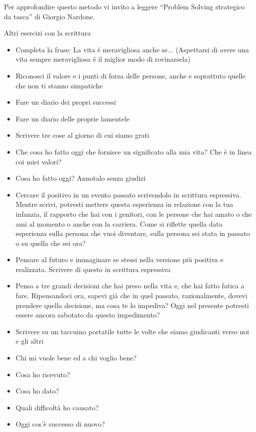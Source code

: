 \documentclass[12pt]{book} %
\begin{document}
Per approfondire questo metodo vi invito a leggere “Problem Solving strategico da
tasca” di Giorgio
Nardone.

Altri esercizi con la scrittura

\begin{itemize}
\item Completa la frase: La vita é meravigliosa anche se... (Aspettarsi di avere una vita sempre meravigliosa é il miglior modo di rovinarsela)
\item Riconosci il valore e i punti di forza delle persone, anche e soprattuto quelle che non ti stanno simpatiche
\item Fare un diario dei propri successi 
\item Fare un diario delle proprie lamentele 
\item Scrivere tre cose al giorno di cui siamo grati
\item Che cosa ho fatto oggi che fornisce un significato alla mia vita? Che è in linea coi miei valori?
\item Cosa ho fatto oggi? Annotalo senza giudizi 
\item Cercare il positivo in un evento passato scrivendolo in scrittura espressiva. Mentre scrivi, potresti mettere
questa esperienza in relazione con la tua infanzia, il rapporto che hai con i genitori, con le persone che hai amato o
che ami al momento o anche con la carriera. Come si riflette quella data esperienza sulla persona che vuoi diventare,
sulla persona sei stata in passato o su quella che sei ora?
\item Pensare al futuro e immaginare se stessi nella versione più positiva e realizzata. Scrivere di questo in scrittura
espressiva
\item Pensa a tre grandi decisioni che hai preso nella vita e, che hai fatto fatica a fare. Ripensandoci ora, sapevi già
che in quel passato, razionalmente, dovevi prendere quella decisione, ma cosa te lo impediva? Oggi nel presente
potresti essere ancora sabotato da questo impedimento?
\item Scrivere su un taccuino portatile tutte le volte che siamo giudicanti verso noi e gli altri
\item Chi mi vuole bene ed a chi voglio bene?
\item Cosa ho ricevuto?
\item Cosa ho dato?
\item Quali difficoltà ho causato?
\item Oggi cos'è successo di nuovo? 

\end{itemize}
\end{document}

